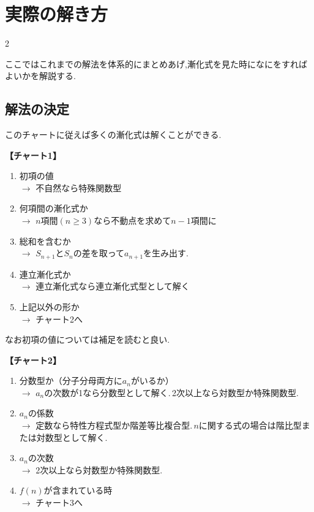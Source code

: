 \documentclass[dvipdfmx,a4paper,11pt,fleqn,openany]{jsbook}
\begin{document}
  \chapter{実際の解き方}
  \begin{multicols*}{2}
    
    ここではこれまでの解法を体系的にまとめあげ,漸化式を見た時になにをすればよいかを解説する.
    \section{解法の決定}
      このチャートに従えば多くの漸化式は解くことができる.
      
      \noindent \textbf{【チャート1】}
      \begin{enumerate}
        \item 初項の値\\
              $\rightarrow$ 不自然なら特殊関数型
        \item 何項間の漸化式か\\
              $\rightarrow$ $n$項間$(n\ge3)$なら不動点を求めて$n-1$項間に
        \item 総和を含むか\\
              $\rightarrow$ $S_{n+1}$と$S_n$の差を取って$a_{n+1}$を生み出す.
        \item 連立漸化式か\\
              $\rightarrow$ 連立漸化式なら連立漸化式型として解く
        \item 上記以外の形か\\
              $\rightarrow$ チャート2へ
      \end{enumerate}
      なお初項の値については補足を読むと良い.

      \noindent \textbf{【チャート2】}
      \begin{enumerate}
          \item 分数型か（分子分母両方に$a_n$がいるか）\\
                $\rightarrow$ $a_n$の次数が1なら分数型として解く.\,2次以上なら対数型か特殊関数型.
          \item $a_n$の係数\\
                $\rightarrow$ 定数なら特性方程式型か階差等比複合型.\,$n$に関する式の場合は階比型または対数型として解く.
          \item $a_n$の次数\\
                $\rightarrow$ 2次以上なら対数型か特殊関数型.
          \item $f(n)$が含まれている時\\
                $\rightarrow$ チャート3へ
      \end{enumerate}


\end{multicols*}
\end{document}
